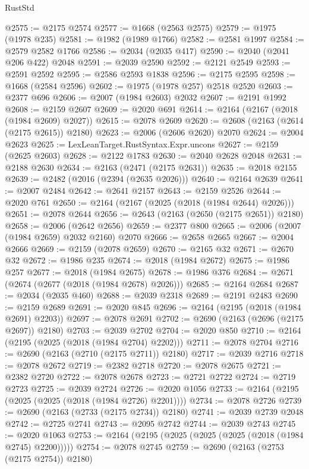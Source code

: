\begin{lexlean}{RustStd}
\begin{coremodule}
@2575 := @2175 @2574
@2577 := @1668 (@2563 @2575)
@2579 := @1975 (@1978 @235)
@2581 := @1982 (@1989 @1766)
@2582 := @2581 @1997
@2584 := @2579 @2582 @1766
@2586 := @2034 (@2035 @417)
@2590 := @2040 (@2041 @206 @422) @2048
@2591 := @2039 @2590
@2592 := @2121 @2549
@2593 := @2591 @2592
@2595 := @2586 @2593 @1838
@2596 := @2175 @2595
@2598 := @1668 (@2584 @2596)
@2602 := @1975 (@1978 @257) @2518 @2520
@2603 := @2377 @696
@2606 := @2007 (@1984 @2603) @2032
@2607 := @2191 @1992
@2608 := @2159 @2607
@2609 := @2020 @691
@2614 := @2164 (@2167 (@2018 (@1984 @2609) @2027))
@2615 := @2078 @2609
@2620 := @2608 (@2163 (@2614 (@2175 @2615)) @2180)
@2623 := @2006 (@2606 @2620) @2070
@2624 := @2004 @2623
@2625 := LexLeanTarget.RustSyntax.Expr.uncons
@2627 := @2159 (@2625 @2603)
@2628 := @2122 @1783
@2630 := @2040 @2628 @2048
@2631 := @2188 @2630
@2634 := @2163 (@2471 (@2175 @2631))
@2635 := @2018 @2155
@2639 := @2482 (@2016 (@2394 (@2635 @2026)))
@2640 := @2164 @2639
@2641 := @2007 @2484
@2642 := @2641 @2157
@2643 := @2159 @2526
@2644 := @2020 @761
@2650 := @2164 (@2167 (@2025 (@2018 (@1984 @2644) @2026)))
@2651 := @2078 @2644
@2656 := @2643 (@2163 (@2650 (@2175 @2651)) @2180)
@2658 := @2006 (@2642 @2656)
@2659 := @2377 @800
@2665 := @2006 (@2007 (@1984 @2659) @2032 @2160) @2070
@2666 := @2658 @2665
@2667 := @2004 @2666
@2669 := @2159 (@2078 @2659)
@2670 := @2165 @32
@2671 := @2670 @32
@2672 := @1986 @235
@2674 := @2018 (@1984 @2672)
@2675 := @1986 @257
@2677 := @2018 (@1984 @2675)
@2678 := @1986 @376
@2684 := @2671 (@2674 (@2677 (@2018 (@1984 @2678) @2026)))
@2685 := @2164 @2684
@2687 := @2034 (@2035 @460)
@2688 := @2039 @2318
@2689 := @2191 @2483
@2690 := @2159 @2689
@2691 := @2020 @845
@2696 := @2164 (@2195 (@2018 (@1984 @2691) @2203))
@2697 := @2078 @2691
@2702 := @2690 (@2163 (@2696 (@2175 @2697)) @2180)
@2703 := @2039 @2702
@2704 := @2020 @850
@2710 := @2164 (@2195 (@2025 (@2018 (@1984 @2704) @2202)))
@2711 := @2078 @2704
@2716 := @2690 (@2163 (@2710 (@2175 @2711)) @2180)
@2717 := @2039 @2716
@2718 := @2078 @2672
@2719 := @2382 @2718
@2720 := @2078 @2675
@2721 := @2382 @2720
@2722 := @2078 @2678
@2723 := @2721 @2722
@2724 := @2719 @2723
@2725 := @2039 @2724
@2726 := @2020 @1056
@2733 := @2164 (@2195 (@2025 (@2025 (@2018 (@1984 @2726) @2201))))
@2734 := @2078 @2726
@2739 := @2690 (@2163 (@2733 (@2175 @2734)) @2180)
@2741 := @2039 @2739 @2048
@2742 := @2725 @2741
@2743 := @2095 @2742
@2744 := @2039 @2743
@2745 := @2020 @1063
@2753 := @2164 (@2195 (@2025 (@2025 (@2025 (@2018 (@1984 @2745) @2200)))))
@2754 := @2078 @2745
@2759 := @2690 (@2163 (@2753 (@2175 @2754)) @2180)

\end{coremodule}
\end{lexlean}
